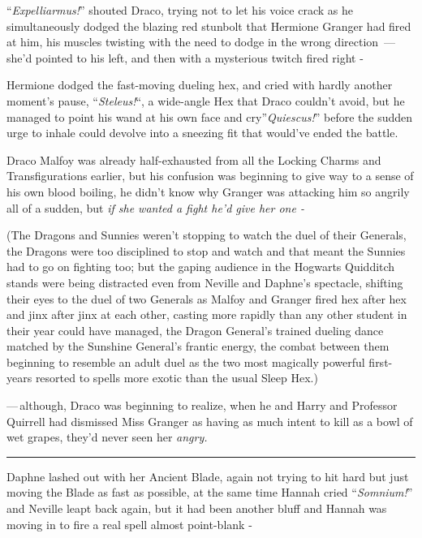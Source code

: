 ``\emph{Expelliarmus!}'' shouted Draco, trying not to let his voice crack as he simultaneously dodged the blazing red stunbolt that Hermione Granger had fired at him, his muscles twisting with the need to dodge in the wrong direction~--- she'd pointed to his left, and then with a mysterious twitch fired right -

Hermione dodged the fast-moving dueling hex, and cried with hardly another moment's pause, ``\emph{Steleus!}``, a wide-angle Hex that Draco couldn't avoid, but he managed to point his wand at his own face and cry''\emph{Quiescus!}'' before the sudden urge to inhale could devolve into a sneezing fit that would've ended the battle.

Draco Malfoy was already half-exhausted from all the Locking Charms and Transfigurations earlier, but his confusion was beginning to give way to a sense of his own blood boiling, he didn't know why Granger was attacking him so angrily all of a sudden, but \emph{if she wanted a fight he'd give her one -}

(The Dragons and Sunnies weren't stopping to watch the duel of their Generals, the Dragons were too disciplined to stop and watch and that meant the Sunnies had to go on fighting too; but the gaping audience in the Hogwarts Quidditch stands were being distracted even from Neville and Daphne's spectacle, shifting their eyes to the duel of two Generals as Malfoy and Granger fired hex after hex and jinx after jinx at each other, casting more rapidly than any other student in their year could have managed, the Dragon General's trained dueling dance matched by the Sunshine General's frantic energy, the combat between them beginning to resemble an adult duel as the two most magically powerful first-years resorted to spells more exotic than the usual Sleep Hex.)

---\,although, Draco was beginning to realize, when he and Harry and Professor Quirrell had dismissed Miss Granger as having as much intent to kill as a bowl of wet grapes, they'd never seen her \emph{angry.}

\begin{center}\rule{3in}{0.4pt}\end{center}

Daphne lashed out with her Ancient Blade, again not trying to hit hard but just moving the Blade as fast as possible, at the same time Hannah cried ``\emph{Somnium!}'' and Neville leapt back again, but it had been another bluff and Hannah was moving in to fire a real spell almost point-blank -

